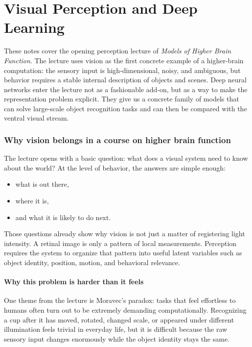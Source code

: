 \chapter{Visual Perception and Deep Learning}

These notes cover the opening perception lecture of \emph{Models of Higher Brain Function}. The lecture uses vision as the first concrete example of a higher-brain computation: the sensory input is high-dimensional, noisy, and ambiguous, but behavior requires a stable internal description of objects and scenes. Deep neural networks enter the lecture not as a fashionable add-on, but as a way to make the representation problem explicit. They give us a concrete family of models that can solve large-scale object recognition tasks and can then be compared with the ventral visual stream.

\subsection{Why vision belongs in a course on higher brain function}

The lecture opens with a basic question: what does a visual system need to know about the world? At the level of behavior, the answers are simple enough:
\begin{itemize}
    \item what is out there,
    \item where it is,
    \item and what it is likely to do next.
\end{itemize}

Those questions already show why vision is not just a matter of registering light intensity. A retinal image is only a pattern of local measurements. Perception requires the system to organize that pattern into useful latent variables such as object identity, position, motion, and behavioral relevance.

\subsubsection{Why this problem is harder than it feels}

One theme from the lecture is Moravec's paradox: tasks that feel effortless to humans often turn out to be extremely demanding computationally. Recognizing a cup after it has moved, rotated, changed scale, or appeared under different illumination feels trivial in everyday life, but it is difficult because the raw sensory input changes enormously while the object identity stays the same.

